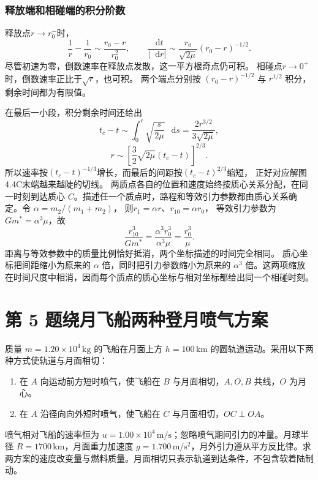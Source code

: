 \documentclass[UTF8,fontset=fandol,a4paper,11pt]{ctexart}
\newcommand{\dd}{\mathop{}\!\mathrm{d}}
\newcommand{\tagline}[1]{\noindent{\small\color{muted}#1}\par}
\begin{document}
\subsubsection*{释放端和相碰端的积分阶数}
释放点$r\to r_0^-$时，
\[
\frac1r-\frac1{r_0}\sim\frac{r_0-r}{r_0^2},
\qquad \frac{\dd t}{|\dd r|}
\sim\frac{r_0}{\sqrt{2\mu}}(r_0-r)^{-1/2}.
\]
尽管初速为零，倒数速率在释放点发散，这一平方根奇点仍可积。
相碰点$r\to0^+$时，倒数速率正比于$\sqrt r$，也可积。
两个端点分别按 $(r_0-r)^{-1/2}$ 与 $r^{1/2}$ 积分，剩余时间都为有限值。

在最后一小段，积分剩余时间还给出
\[
t_c-t\sim\int_0^r\sqrt{\frac{s}{2\mu}}\,\dd s
=\frac{2r^{3/2}}{3\sqrt{2\mu}},
\]
\[
r\sim\left[\frac32\sqrt{2\mu}(t_c-t)\right]^{2/3}.
\]
所以速率按$(t_c-t)^{-1/3}$增长，而最后的间距按$(t_c-t)^{2/3}$缩短，
正好对应解图4.4C末端越来越陡的切线。
两质点各自的位置和速度始终按质心关系分配，在同一时刻到达质心 $C$。描述任一个质点时，路程和等效引力参数都由质心关系确定。令 $\alpha=m_2/(m_1+m_2)$，
则$r_1=\alpha r$、$r_{10}=\alpha r_0$，
等效引力参数为$Gm^*=\alpha^3\mu$，故
\[
\frac{r_{10}^3}{Gm^*}=\frac{\alpha^3r_0^3}{\alpha^3\mu}
=\frac{r_0^3}{\mu}.
\]
距离与等效参数中的质量比例恰好抵消，两个坐标描述的时间完全相同。
质心坐标把间距缩小为原来的 $\alpha$ 倍，同时把引力参数缩小为原来的 $\alpha^3$ 倍。这两项缩放在时间尺度中相消，因而每个质点的质心坐标与相对坐标都给出同一个相碰时刻。





\section*{第 5 题\quad 绕月飞船两种登月喷气方案}

\tagline{M-04-05}

质量 $m=1.20\times10^4\,\mathrm{kg}$ 的飞船在月面上方 $h=100\,\mathrm{km}$ 的圆轨道运动。采用以下两种方式使轨道与月面相切：
\begin{enumerate}
\item 在 $A$ 向运动前方短时喷气，使飞船在 $B$ 与月面相切，$A,O,B$ 共线，$O$ 为月心。
\item 在 $A$ 沿径向向外短时喷气，使飞船在 $C$ 与月面相切，$OC\perp OA$。
\end{enumerate}
喷气相对飞船的速率恒为 $u=1.00\times10^4\,\mathrm{m/s}$；忽略喷气期间引力的冲量。月球半径 $R=1700\,\mathrm{km}$，月面重力加速度 $g=1.700\,\mathrm{m/s^2}$，月外引力遵从平方反比律。求两方案的速度改变量与燃料质量。月面相切只表示轨道到达条件，不包含软着陆制动。
\end{document}

